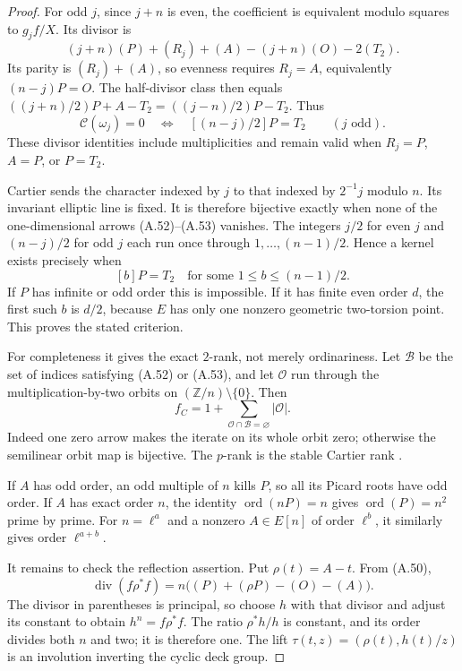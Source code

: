 \begin{proof}
For odd $j$, since $j+n$ is even, the coefficient
is equivalent modulo squares to $g_jf/X$. Its divisor is
\[
 (j+n)(P)+(R_j)+(A)-(j+n)(O)-2(T_2).
\]
Its parity is $(R_j)+(A)$, so evenness requires
$R_j=A$, equivalently $(n-j)P=O$. The half-divisor
class then equals
$((j+n)/2)P+A-T_2=((j-n)/2)P-T_2$.
Thus
\[
 \mathcal C(\omega_j)=0
       \quad\Longleftrightarrow\quad [(n-j)/2]P=T_2
       \qquad(j\text{ odd}).                            \tag{A.53}
\]
These divisor identities include multiplicities and
remain valid when $R_j=P$, $A=P$, or $P=T_2$.

Cartier sends the character indexed by $j$ to that
indexed by $2^{-1}j$ modulo $n$. Its invariant
elliptic line is fixed. It is therefore bijective
exactly when none of the one-dimensional arrows
\textup{(A.52)--(A.53)} vanishes. The integers $j/2$
for even $j$ and $(n-j)/2$ for odd $j$ each run once
through $1,\ldots,(n-1)/2$. Hence a kernel exists
precisely when
\[
 [b]P=T_2\quad\text{for some }1\le b\le(n-1)/2.
\]
If $P$ has infinite or odd order this is impossible.
If it has finite even order $d$, the first such $b$
is $d/2$, because $E$ has only one nonzero geometric
two-torsion point. This proves the stated criterion.

For completeness it gives the exact $2$-rank, not
merely ordinariness. Let $\mathscr B$ be the set of
indices satisfying \textup{(A.52)} or \textup{(A.53)},
and let $\mathscr O$ run through the multiplication-by-two
orbits on $(\mathbb Z/n)\setminus\{0\}$. Then
\[
 f_C=1+\sum_{\mathscr O\cap\mathscr B=\varnothing}
                  |\mathscr O|.                         \tag{A.54}
\]
Indeed one zero arrow makes the iterate on its whole
orbit zero; otherwise the semilinear orbit map is
bijective. The $p$-rank is the stable Cartier rank
\citep[Lemma 4.2.6, p.~37]{A_Pries2024AWS}.

If $A$ has odd order, an odd multiple of $n$ kills
$P$, so all its Picard roots have odd order.
If $A$ has exact order $n$, the identity
$\operatorname{ord}(nP)=n$ gives
$\operatorname{ord}(P)=n^2$ prime by prime.
For $n=\ell^a$ and a nonzero $A\in E[n]$ of order
$\ell^b$, it similarly gives order $\ell^{a+b}$.

It remains to check the reflection assertion.
Put $\rho(t)=A-t$. From \textup{(A.50)},
\[
 \operatorname{div}(f\rho^*f)
       =n\bigl((P)+(\rho P)-(O)-(A)\bigr).
\]
The divisor in parentheses is principal, so choose
$h$ with that divisor and adjust its constant to
obtain $h^n=f\rho^*f$. The ratio $\rho^*h/h$ is
constant, and its order divides both $n$ and two;
it is therefore one. The lift
$\tau(t,z)=(\rho(t),h(t)/z)$ is an involution
inverting the cyclic deck group.


\end{proof}
